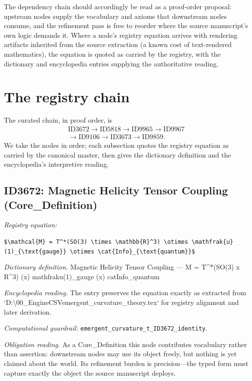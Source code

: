 \documentclass[11pt]{article}
\theoremstyle{remark}
\begin{document}
The dependency chain should accordingly be read as a proof-order proposal: upstream nodes supply the vocabulary and axioms that downstream nodes consume, and the refinement pass is free to reorder where the source manuscript's own logic demands it. Where a node's registry equation arrives with rendering artifacts inherited from the source extraction (a known cost of text-rendered mathematics), the equation is quoted as carried by the registry, with the dictionary and encyclopedia entries supplying the authoritative reading.

\section{The registry chain}
\label{sec:chain}

The curated chain, in proof order, is
\begin{equation*}
\begin{gathered}
\text{ID3672} \to \text{ID5818} \to \text{ID9965} \to \text{ID9967} \\
\to \text{ID9106} \to \text{ID3673} \to \text{ID9859}.
\end{gathered}
\end{equation*}
We take the nodes in order; each subsection quotes the registry equation as carried by the canonical master, then gives the dictionary definition and the encyclopedia's interpretive reading.

\subsection{ID3672: Magnetic Helicity Tensor Coupling (Core\_Definition)}

\noindent\textit{Registry equation:}\par
{\small\texttt{\$\textbackslash{}mathcal\{M\} = T\textasciicircum{}*(SO(3) \textbackslash{}times \textbackslash{}mathbb\{R\}\textasciicircum{}3) \textbackslash{}otimes \textbackslash{}mathfrak\{u\}(1)\_\{\textbackslash{}text\{gauge\}\} \textbackslash{}otimes \textbackslash{}cat\{Info\}\_\{\textbackslash{}text\{quantum\}\}\$}}\par\medskip
\noindent\textit{Dictionary definition.} Magnetic Helicity Tensor Coupling --- M = T\textasciicircum{}*(SO(3) x R\textasciicircum{}3) (x) mathfraku(1)\_gauge (x) catInfo\_quantum\par\medskip
\noindent\textit{Encyclopedia reading.} The entry preserves the equation exactly as extracted from `D:\textbackslash{}00\_EngineCSVemergent\_curvature\_theory.tex` for registry alignment and later derivation.
\par\medskip\noindent\textit{Computational guardrail:} \texttt{emergent\_curvature\_t\_ID3672\_identity}.
\par\medskip\noindent\textit{Obligation reading.} As a Core\_Definition this node contributes vocabulary rather than assertion: downstream nodes may use its object freely, but nothing is yet claimed about the world. Its refinement burden is precision---the typed form must capture exactly the object the source manuscript deploys.
\end{document}
